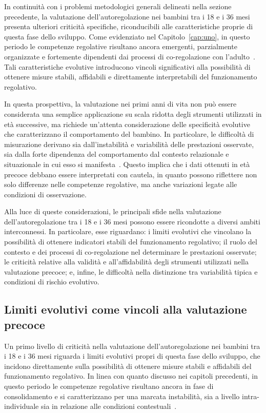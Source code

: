         In continuità con i problemi metodologici generali delineati nella sezione precedente, la valutazione dell'autoregolazione nei bambini tra i 18 e i 36 mesi presenta ulteriori criticità specifiche, riconducibili alle caratteristiche proprie di questa fase dello sviluppo. Come evidenziato nel Capitolo~\ref{cap:uno}, in questo periodo le competenze regolative risultano ancora emergenti, parzialmente organizzate e fortemente dipendenti dai processi di co-regolazione con l'adulto~\cite{blair2015,calkins2007}. Tali caratteristiche evolutive introducono vincoli significativi alla possibilità di ottenere misure stabili, affidabili e direttamente interpretabili del funzionamento regolativo.

        In questa prospettiva, la valutazione nei primi anni di vita non può essere considerata una semplice applicazione su scala ridotta degli strumenti utilizzati in età successive, ma richiede un'attenta considerazione delle specificità evolutive che caratterizzano il comportamento del bambino. In particolare, le difficoltà di misurazione derivano sia dall'instabilità e variabilità delle prestazioni osservate, sia dalla forte dipendenza del comportamento dal contesto relazionale e situazionale in cui esso si manifesta~\cite{blair2015,doebel2020}. Questo implica che i dati ottenuti in età precoce debbano essere interpretati con cautela, in quanto possono riflettere non solo differenze nelle competenze regolative, ma anche variazioni legate alle condizioni di osservazione.

        Alla luce di queste considerazioni, le principali sfide nella valutazione dell'autoregolazione tra i 18 e i 36 mesi possono essere ricondotte a diversi ambiti interconnessi. In particolare, esse riguardano: i limiti evolutivi che vincolano la possibilità di ottenere indicatori stabili del funzionamento regolativo; il ruolo del contesto e dei processi di co-regolazione nel determinare le prestazioni osservate; le criticità relative alla validità e all'affidabilità degli strumenti utilizzati nella valutazione precoce; e, infine, le difficoltà nella distinzione tra variabilità tipica e condizioni di rischio evolutivo.

        \subsection{Limiti evolutivi come vincoli alla valutazione precoce}
        \label{sec:3_2_1}

            Un primo livello di criticità nella valutazione dell'autoregolazione nei bambini tra i 18 e i 36 mesi riguarda i limiti evolutivi propri di questa fase dello sviluppo, che incidono direttamente sulla possibilità di ottenere misure stabili e affidabili del funzionamento regolativo. In linea con quanto discusso nei capitoli precedenti, in questo periodo le competenze regolative risultano ancora in fase di consolidamento e si caratterizzano per una marcata instabilità, sia a livello intra-individuale sia in relazione alle condizioni contestuali~\cite{blair2015,diamond2013}.

